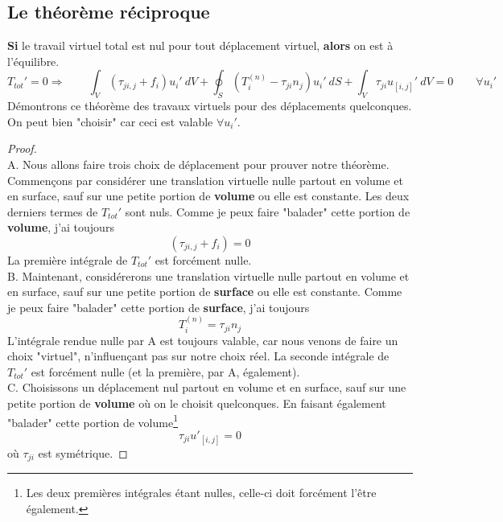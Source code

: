 	\subsection{Le théorème réciproque}
	\textbf{Si} le travail virtuel total est nul pour tout déplacement virtuel, 
	\textbf{alors} on est à l'équilibre.
	\begin{equation}
	T_{tot}' = 0\Longrightarrow\qquad 
	\int_V(\tau_{ji,j}+f_i)u_i'\ dV +\oint_S (T_i^{(n)}-\tau_{ji}
	n_j)u_i'\ dS + \int_V \tau_{ji}u_{[i,j]}'\ dV=0\qquad \forall u_i'
	\end{equation}
	Démontrons ce théorème des travaux virtuels pour des déplacements quelconques.
	On peut bien "choisir" car ceci est valable $\forall u_i'$.\\
	\begin{proof}\ \\
	\textsc{A.} 
	Nous allons faire trois choix de déplacement pour prouver notre théorème. 
	Commençons par considérer une translation virtuelle nulle partout en volume 
	et en surface, sauf sur une petite portion de \textbf{volume} ou elle est constante. 
	Les deux derniers termes de $T_{tot}'$ sont nuls. Comme je peux faire "balader" 
	cette portion de \textbf{volume}, j'ai toujours
	\begin{equation}
	(\tau_{ji,j}+f_i) = 0
	\end{equation}
	La première intégrale de $T_{tot}'$ est forcément nulle.\\
	
	\textsc{B.} 
	Maintenant, considérerons une translation virtuelle nulle partout en volume 
	et en surface, sauf sur une petite portion de \textbf{surface} ou elle est constante. 
	Comme je peux faire "balader" cette portion de \textbf{surface}, j'ai toujours
	\begin{equation}
	T_i^{(n)} = \tau_{ji}n_j
	\end{equation}
	L'intégrale rendue nulle par \textsc{A} est toujours valable, car nous venons 
	de faire un choix "virtuel", n’influençant pas sur notre choix réel. La seconde 
	intégrale de $T_{tot}'$ est forcément nulle (et la première, par \textsc{A}, 
	également).\\
	
	\textsc{C.} 
	Choisissons un déplacement nul partout en volume et en surface, sauf sur une 
	petite portion de \textbf{volume} où on le choisit quelconques. En faisant 
	également "balader" cette portion de volume\footnote{Les deux premières 
	intégrales étant nulles, celle-ci doit forcément l'être également.}
	\begin{equation}
	\tau_{ji}u'_{[i,j]} = 0
	\end{equation}
	où $\tau_{ji}$ est symétrique.
	\end{proof}



